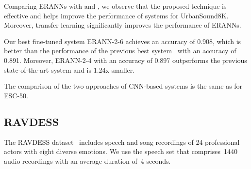 \documentclass{article}
\begin{document}
\begin{sloppy}
\vspace{-1.5em}
\begin{table}[th]
  \caption{Comparison of APR systems for UrbanSound8K}
  \centering
  \label{tab:urban}
\end{table}

Comparing ERANNs with  and , we observe that the proposed technique is effective and helps improve the performance of systems for UrbanSound8K. Moreover, transfer learning significantly improves the performance of ERANNs. 

Our best fine-tuned system \mbox{ERANN-2-6} achieves an accuracy of 0.908, which is better than the performance of the previous best system~\cite{Guzhov2021ESResNeXtfbspLR} with an accuracy of 0.891. Moreover, \mbox{ERANN-2-4} with an accuracy of 0.897 outperforms the previous state-of-the-art system and is 1.24x smaller.

The comparison of the two approaches of CNN-based systems is the same as for ESC-50.


\subsection{RAVDESS}
The RAVDESS dataset~\cite{Livingstone2018TheRA} includes speech and song recordings of 24 professional actors with eight diverse emotions. We use the speech set that comprises~1440 audio recordings with an average duration of~4 seconds. 


\end{sloppy}
\end{document}
